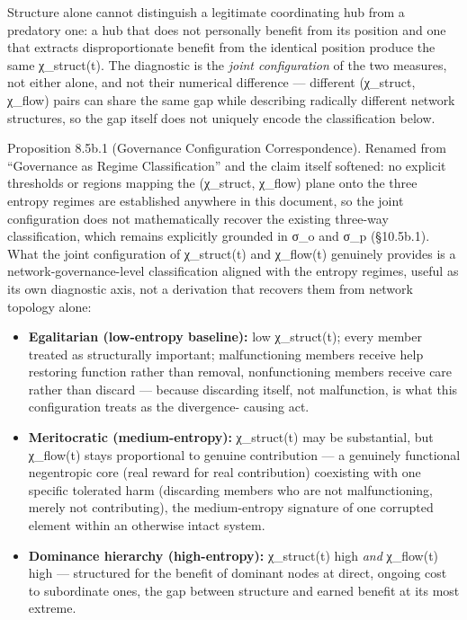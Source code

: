 \documentclass[
]{article}
\begin{document}
Structure alone cannot distinguish a legitimate coordinating hub from a
predatory one: a hub that does not personally benefit from its position
and one that extracts disproportionate benefit from the identical
position produce the same χ\_struct(t). The diagnostic is the
\emph{joint configuration} of the two measures, not either alone, and
not their numerical difference --- different (χ\_struct, χ\_flow) pairs
can share the same gap while describing radically different network
structures, so the gap itself does not uniquely encode the
classification below.

Proposition 8.5b.1 (Governance Configuration Correspondence). Renamed
from ``Governance as Regime Classification'' and the claim itself
softened: no explicit thresholds or regions mapping the (χ\_struct,
χ\_flow) plane onto the three entropy regimes are established anywhere
in this document, so the joint configuration does not mathematically
recover the existing three-way classification, which remains explicitly
grounded in σ\_o and σ\_p (§10.5b.1). What the joint configuration of
χ\_struct(t) and χ\_flow(t) genuinely provides is a
network-governance-level classification aligned with the entropy
regimes, useful as its own diagnostic axis, not a derivation that
recovers them from network topology alone:

\begin{itemize}
\item
  \textbf{Egalitarian (low-entropy baseline):} low χ\_struct(t); every
  member treated as structurally important; malfunctioning members
  receive help restoring function rather than removal, nonfunctioning
  members receive care rather than discard --- because discarding
  itself, not malfunction, is what this configuration treats as the
  divergence- causing act.
\item
  \textbf{Meritocratic (medium-entropy):} χ\_struct(t) may be
  substantial, but χ\_flow(t) stays proportional to genuine contribution
  --- a genuinely functional negentropic core (real reward for real
  contribution) coexisting with one specific tolerated harm (discarding
  members who are not malfunctioning, merely not contributing), the
  medium-entropy signature of one corrupted element within an otherwise
  intact system.
\item
  \textbf{Dominance hierarchy (high-entropy):} χ\_struct(t) high
  \emph{and} χ\_flow(t) high --- structured for the benefit of dominant
  nodes at direct, ongoing cost to subordinate ones, the gap between
  structure and earned benefit at its most extreme.
\end{itemize}
\end{document}
